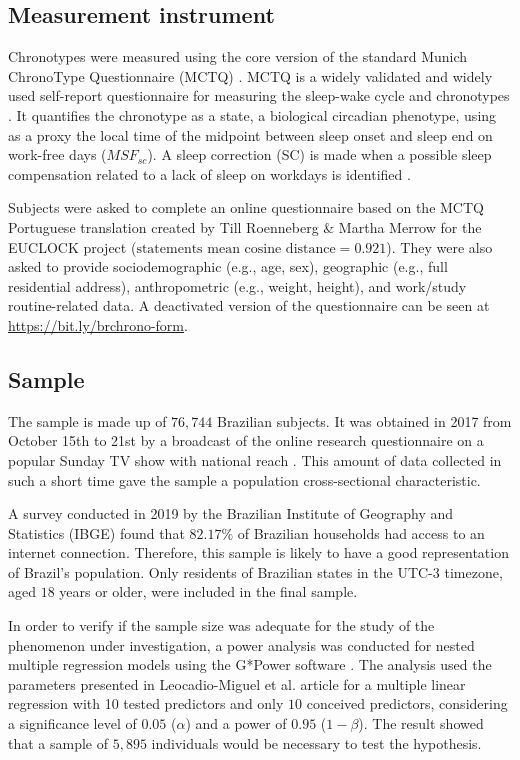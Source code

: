 \documentclass[
12pt,
openright,
oneside,
a4paper,
chapter=TITLE,
section=TITLE,
french,
spanish,
brazil,
english
]{abntex2}\usepackage{array}
\begin{document}
\subsection{Measurement instrument}\label{measurement-instrument}

Chronotypes were measured using the core version of the standard Munich
ChronoType Questionnaire (MCTQ) \autocite{roenneberg2003}. MCTQ is a
widely validated and widely used self-report questionnaire for measuring
the sleep-wake cycle and chronotypes \autocite{roenneberg2019}. It
quantifies the chronotype as a state, a biological circadian phenotype,
using as a proxy the local time of the midpoint between sleep onset and
sleep end on work-free days (\(MSF_{sc}\)). A sleep correction (SC) is
made when a possible sleep compensation related to a lack of sleep on
workdays is identified \autocite{roenneberg2012}.

Subjects were asked to complete an online questionnaire based on the
MCTQ Portuguese translation created by Till Roenneberg \& Martha Merrow
for the EUCLOCK project \autocite{roenneberg2006}
(\(\text{statements mean cosine distance} = 0.921\)). They were also
asked to provide sociodemographic (e.g., age, sex), geographic (e.g.,
full residential address), anthropometric (e.g., weight, height), and
work/study routine-related data. A deactivated version of the
questionnaire can be seen at \url{https://bit.ly/brchrono-form}.

\subsection{Sample}\label{sample}

The sample is made up of \(76,744\) Brazilian subjects. It was obtained
in 2017 from October 15th to 21st by a broadcast of the online research
questionnaire on a popular Sunday TV show with national reach
\autocite{globo2017}. This amount of data collected in such a short time
gave the sample a population cross-sectional characteristic.

A survey conducted in 2019 by the Brazilian Institute of Geography and
Statistics (IBGE) \autocite*{ibge2021} found that \(82.17\%\) of
Brazilian households had access to an internet connection. Therefore,
this sample is likely to have a good representation of Brazil's
population. Only residents of Brazilian states in the UTC-3 timezone,
aged \(18\) years or older, were included in the final sample.

In order to verify if the sample size was adequate for the study of the
phenomenon under investigation, a power analysis was conducted for
nested multiple regression models using the G*Power software
\autocite{faul2007}. The analysis used the parameters presented in
Leocadio-Miguel et al. \autocite*{leocadio-miguel2017} article for a
multiple linear regression with 10 tested predictors and only \(10\)
conceived predictors, considering a significance level of \(0.05\)
(\(\alpha\)) and a power of \(0.95\) (\(1 - \beta\)). The result showed
that a sample of \(5,895\) individuals would be necessary to test the
hypothesis.
\end{document}
